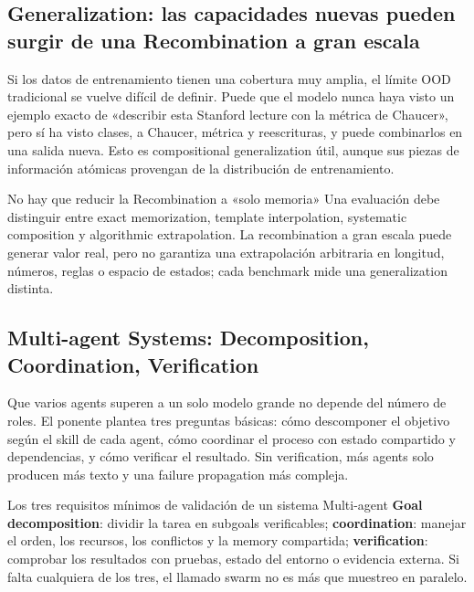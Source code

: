 
\subsection{Generalization: las capacidades nuevas pueden surgir de una Recombination a gran escala}

Si los datos de entrenamiento tienen una cobertura muy amplia, el límite OOD tradicional se vuelve difícil de definir. Puede que el modelo nunca haya visto un ejemplo exacto de «describir esta Stanford lecture con la métrica de Chaucer», pero sí ha visto clases, a Chaucer, métrica y reescrituras, y puede combinarlos en una salida nueva. Esto es compositional generalization útil, aunque sus piezas de información atómicas provengan de la distribución de entrenamiento.

\begin{knowledgebox}{No hay que reducir la Recombination a «solo memoria»}
Una evaluación debe distinguir entre exact memorization, template interpolation, systematic composition y algorithmic extrapolation. La recombination a gran escala puede generar valor real, pero no garantiza una extrapolación arbitraria en longitud, números, reglas o espacio de estados; cada benchmark mide una generalization distinta.
\end{knowledgebox}

\subsection{Multi-agent Systems: Decomposition, Coordination, Verification}

Que varios agents superen a un solo modelo grande no depende del número de roles. El ponente plantea tres preguntas básicas: cómo descomponer el objetivo según el skill de cada agent, cómo coordinar el proceso con estado compartido y dependencias, y cómo verificar el resultado. Sin verification, más agents solo producen más texto y una failure propagation más compleja.

\begin{importantbox}{Los tres requisitos mínimos de validación de un sistema Multi-agent}
\textbf{Goal decomposition}: dividir la tarea en subgoals verificables; \textbf{coordination}: manejar el orden, los recursos, los conflictos y la memory compartida; \textbf{verification}: comprobar los resultados con pruebas, estado del entorno o evidencia externa. Si falta cualquiera de los tres, el llamado swarm no es más que muestreo en paralelo.
\end{importantbox}

